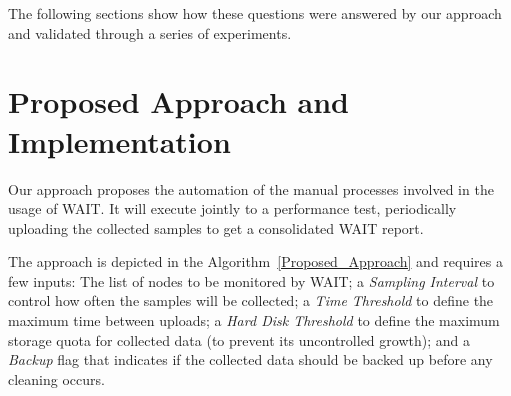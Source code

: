 \documentclass[runningheads,a4paper]{llncs}
\begin{document}
The following sections show how these questions were answered by our approach
and validated through a series of experiments.

\vspace{-5pt}
\section{Proposed Approach and Implementation}
\vspace{-5pt}

Our approach proposes the automation of the manual processes involved in the
usage of WAIT. It will execute jointly to a performance test, periodically
uploading the collected samples to get a consolidated WAIT report.

The approach is depicted in the Algorithm~\ref{Proposed_Approach} and requires
a few inputs: The list of nodes to be monitored by WAIT; a \emph{Sampling
Interval} to control how often the samples will be collected; a \emph{Time
Threshold} to define the maximum time between uploads; a \emph{Hard Disk
Threshold} to define the maximum storage quota for collected data (to prevent
its uncontrolled growth); and a \emph{Backup} flag that indicates if the collected
data should be backed up before any cleaning occurs.
\end{document}
